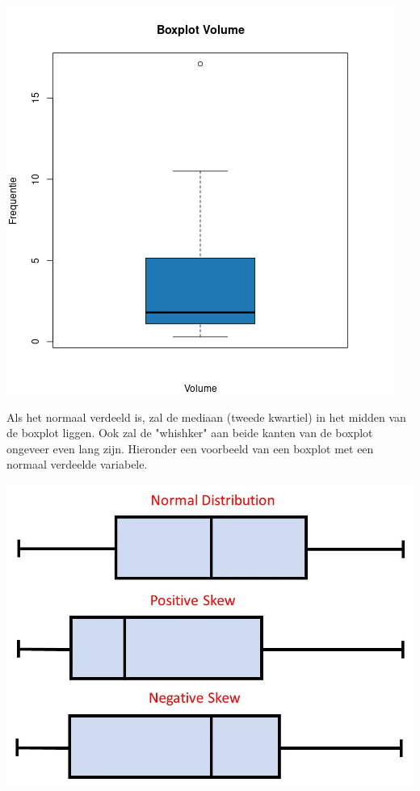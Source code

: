 \documentclass[12pt]{article}
\begin{document}
\noindent\begin{minipage}{0.5\linewidth}
    \centering
    \includegraphics[width=\linewidth]{vragen/vraag1/images/box_volume.png}
    \label{fig:boxplot_volume}
\end{minipage}
Als het normaal verdeeld is, zal de mediaan (tweede kwartiel) in het midden van de boxplot liggen.
Ook zal de "whishker" aan beide kanten van de boxplot ongeveer even lang zijn. 
Hieronder een voorbeeld van een boxplot met een normaal verdeelde variabele.
\newline\newline
\noindent\begin{minipage}{0.5\linewidth}
    \centering
    \includegraphics[width=\linewidth]{vragen/vraag1/images/boxplots.png}
    \label{fig:boxplot_ref}
\end{minipage}
\end{document}
